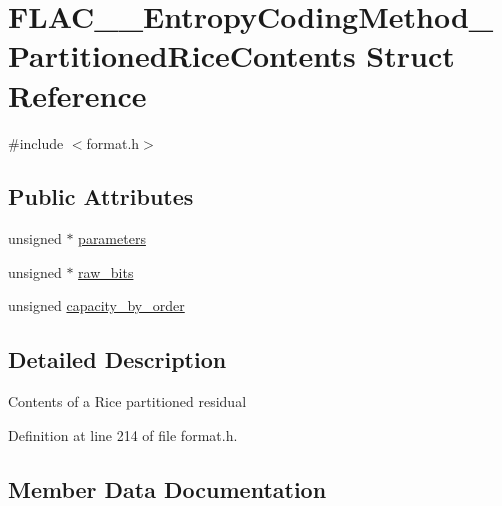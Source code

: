 \hypertarget{struct_f_l_a_c_____entropy_coding_method___partitioned_rice_contents}{}\section{F\+L\+A\+C\+\_\+\+\_\+\+Entropy\+Coding\+Method\+\_\+\+Partitioned\+Rice\+Contents Struct Reference}
\label{struct_f_l_a_c_____entropy_coding_method___partitioned_rice_contents}


{\ttfamily \#include $<$format.\+h$>$}

\subsection*{Public Attributes}
\begin{DoxyCompactItemize}
\item 
unsigned $\ast$ \hyperlink{struct_f_l_a_c_____entropy_coding_method___partitioned_rice_contents_a06e97d40923f195410a65da9311ab6a2}{parameters}
\item 
unsigned $\ast$ \hyperlink{struct_f_l_a_c_____entropy_coding_method___partitioned_rice_contents_a915eb5369d39924bc29c948c29834279}{raw\+\_\+bits}
\item 
unsigned \hyperlink{struct_f_l_a_c_____entropy_coding_method___partitioned_rice_contents_abb60aca8d98bf9299558f230dfe83bc1}{capacity\+\_\+by\+\_\+order}
\end{DoxyCompactItemize}


\subsection{Detailed Description}
Contents of a Rice partitioned residual 

Definition at line 214 of file format.\+h.



\subsection{Member Data Documentation}
